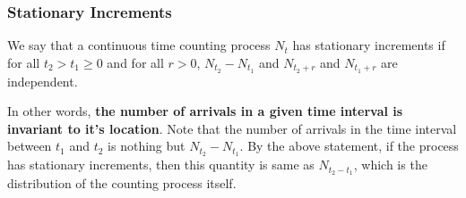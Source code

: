 \documentclass[../../probability-notes.tex]{subfiles}
\begin{document}
    \subsubsection{Stationary Increments}
    We say that a continuous time counting process $N_{t}$ has stationary increments if for all $t_{2} > t_{1} \geq 0$ and for all $r > 0$, $N_{t_{2}} - N_{t_{1}}$ and $N_{t_{2} + r}$ and $N_{t_{1} + r}$ are independent.\newline

    In other words, \textbf{the number of arrivals in a given time interval is invariant to it's location}. Note that the number of arrivals in the time interval between $t_{1}$ and $t_{2}$ is nothing but $N_{t_{2}} - N_{t_{1}}$. By the above statement, if the process has stationary increments, then this quantity is same as $N_{t_{2} - t_{1}}$, which is the distribution of the counting process itself.
\end{document}
